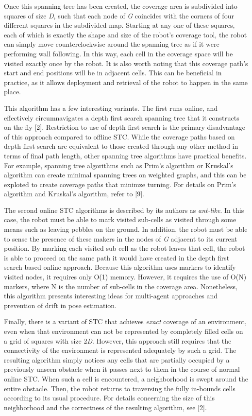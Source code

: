 \documentclass[letterpaper, 12pt, leqno]{report}
\begin{document}
Once this spanning tree has been created, the coverage area is subdivided into squares of size \textit{D}, such that each node of \textit{G} coincides with the corners of four different squares in the subdivided map. Starting at any one of these squares, each of which is exactly the shape and size of the robot's coverage tool, the robot can simply move counterclockwise around the spanning tree as if it were performing wall following. In this way, each cell in the coverage space will be visited exactly once by the robot. It is also worth noting that this coverage path's start and end positions will be in adjacent cells. This can be beneficial in practice, as it allows deployment and retrieval of the robot to happen in the same place.


This algorithm has a few interesting variants. The first runs online, and effectively circumnavigates a depth first search spanning tree that it constructs on the fly [2]. Restriction to use of depth first search is the primary disadvantage of this approach compared to offline STC. While the coverage paths based on depth first search are equivalent to those created through any other method in terms of final path length, other spanning tree algorithms have practical benefits. For example, spanning tree algorithms such as Prim's algorithm or Kruskal's algorithm can create minimal spanning trees on weighted graphs, and this can be exploted to create coverage paths that minimze turning. For details on Prim's algorithm and Kruskal's algorithm, refer to [9]. 

The second online STC algorithms is described by its authors as \textit{ant-like}. In this case, the robot must be able to mark visited sub-cells as visited through some means such as leaving pebbles on the ground. In addition, the robot must be able to sense the presence of these makers in the nodes of \textit{G} adjacent to its current position. By marking each visited sub cell as the robot leaves that cell, the robot is able to proceed on the same path it would have created in the depth first search based online approach. Because this algorithm uses markers to identify visited nodes, it requires only O(1) memory. However, it requires the use of O(N) markers, where N is the number of sub-cells in the coverage area. Nonetheless, this algorithm presents interesting ideas for multi-agent approaches and prevention of drift in pose estimation.

Finally, there is a variant of STC that achieves \textit{exact} coverage of an environment, even when that environment can not be represented by completely filled cells on a grid of squares with size 2\textit{D}. However, this approach still requires that the connectivity of the environment is represented adequately by such a grid. The resulting algorithm simply notices any cells that are partially occupied by a previously unseen obstacle when it passes next to them in the course of normal online STC. When such a cell is encountered, a neighborhood is swept around the entire obstacle. Then, the robot returns to traversing the fully in-bounds cells according to its usual procedure. For details concerning the size of this neighborhood and the correctness of the resulting algorithm, see [2].
\end{document}
